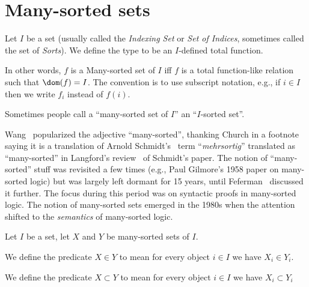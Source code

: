 
\chapter{Many-sorted sets}

\begin{definition}\label{def:pboole:many-sorted-set}
Let $I$ be a set (usually called the \emph{Indexing Set} or 
\emph{Set of Indices}, sometimes called the set of \emph{Sorts}).
We define the type  to be an
$I$-defined total function.

In other words, $f$ is a Many-sorted set of $I$ iff $f$ is a total
function-like relation such that $\dom(f)=I$. The convention is to use
subscript notation, e.g., if $i\in I$ then we write $f_{i}$ instead of $f(i)$.

Sometimes people call a ``many-sorted set of $I$'' an ``$I$-sorted set''.
\end{definition}

\begin{remark}
Wang~\cite{wang1952logic} popularized the adjective ``many-sorted'',
thanking Church in a footnote saying it is a translation of
Arnold Schmidt's~\cite{schmidt1938deduktive} term ``\textit{mehrsortig}'' translated as ``many-sorted'' in
Langford's review~\cite{langford1939arnold} of Schmidt's paper. The
notion of ``many-sorted'' stuff was revisited a few times (e.g., Paul
Gilmore's 1958 paper on many-sorted logic) but was largely left
dormant for 15 years, until Feferman~\cite{feferman1967lectures}
discussed it further. The focus during this period was on syntactic
proofs in many-sorted logic. The notion of many-sorted sets emerged in
the 1980s when the attention shifted to the \emph{semantics} of
many-sorted logic.
\end{remark}

\begin{definition}
Let $I$ be a set, let $X$ and $Y$ be many-sorted sets of $I$.

We define the predicate $X\in Y$ to mean for every object $i\in I$
we have $X_{i}\in Y_{i}$.

We define the predicate $X\subset Y$ to mean for every object $i\in I$
we have $X_{i}\subset Y_{i}$
\end{definition}

